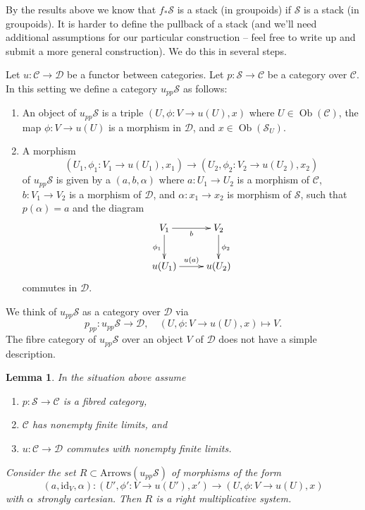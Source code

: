 \documentclass{stacks-project}
\theoremstyle{plain}
\newtheorem{lemma}[subsection]{Lemma}
\theoremstyle{definition}
\theoremstyle{remark}
\numberwithin{equation}{subsection}
\def\Ob{\mathop{\mathrm{Ob}}\nolimits}
\begin{document}
\noindent
By the results above we know that $f_*\mathcal{S}$ is a stack (in groupoids)
if $\mathcal{S}$ is a stack (in groupoids).
It is harder to define the pullback of a stack (and we'll need additional
assumptions for our particular construction -- feel free to write up and
submit a more general construction). We do this in several steps.

\medskip\noindent
Let $u : \mathcal{C} \to \mathcal{D}$ be a functor between categories.
Let $p : \mathcal{S} \to \mathcal{C}$ be a category over $\mathcal{C}$.
In this setting we define a category $u_{pp}\mathcal{S}$ as follows:
\begin{enumerate}
\item An object of $u_{pp}\mathcal{S}$ is a triple
$(U, \phi : V \to u(U), x)$ where $U \in \Ob(\mathcal{C})$,
the map $\phi : V \to u(U)$ is a morphism in $\mathcal{D}$,
and $x \in \Ob(\mathcal{S}_U)$.
\item A morphism
$$
(U_1, \phi_1 : V_1 \to u(U_1), x_1)
\longrightarrow
(U_2, \phi_2 : V_2 \to u(U_2), x_2)
$$
of $u_{pp}\mathcal{S}$ is given by a
$(a, b, \alpha)$ where $a : U_1 \to U_2$ is a morphism of $\mathcal{C}$,
$b : V_1 \to V_2$ is a morphism of $\mathcal{D}$, and
$\alpha : x_1 \to x_2$ is morphism of $\mathcal{S}$,
such that $p(\alpha) = a$ and the diagram
$$
\xymatrix{
V_1 \ar[d]_{\phi_1} \ar[r]_b & V_2 \ar[d]^{\phi_2} \\
u(U_1) \ar[r]^{u(a)} & u(U_2)
}
$$
commutes in $\mathcal{D}$.
\end{enumerate}
We think of $u_{pp}\mathcal{S}$ as a category over $\mathcal{D}$ via
$$
p_{pp} : u_{pp}\mathcal{S} \longrightarrow \mathcal{D},
\quad
(U, \phi : V \to u(U), x) \longmapsto V.
$$
The fibre category of $u_{pp}\mathcal{S}$ over an object $V$ of $\mathcal{D}$
does not have a simple description.

\begin{lemma}
\label{lemma-right-multiplicative-system}
In the situation above assume
\begin{enumerate}
\item $p : \mathcal{S} \to \mathcal{C}$ is a fibred category,
\item $\mathcal{C}$ has nonempty finite limits, and
\item $u : \mathcal{C} \to \mathcal{D}$ commutes with nonempty finite limits.
\end{enumerate}
Consider the set $R \subset \text{Arrows}(u_{pp}\mathcal{S})$ of morphisms
of the form
$$
(a, \text{id}_V, \alpha) :
(U', \phi' : V \to u(U'), x')
\longrightarrow
(U, \phi : V \to u(U), x)
$$
with $\alpha$ strongly cartesian. Then $R$ is a right multiplicative system.
\end{lemma}
\end{document}

